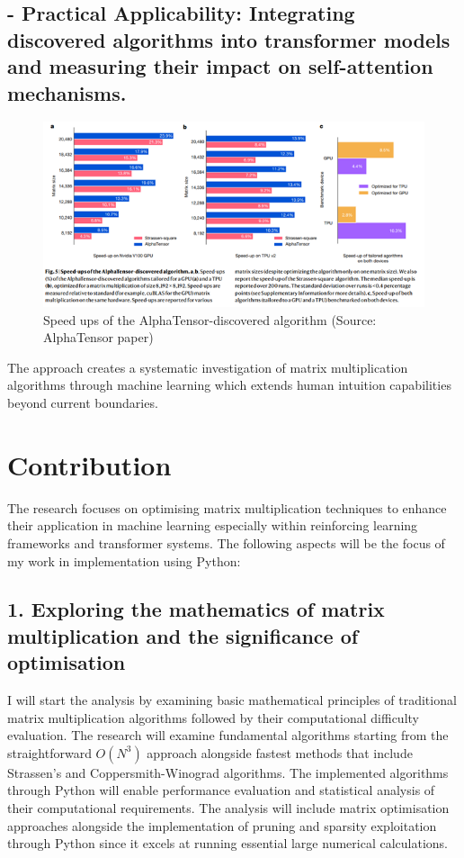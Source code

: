 \documentclass{article}
\begin{document}
\subsection{- Practical Applicability: Integrating discovered algorithms into transformer models and measuring their impact on self-attention mechanisms.} 
\begin{figure}[H]
    \centering
    \includegraphics[width=0.6\linewidth]{Picture3.png}
    \caption{Speed ups of the AlphaTensor-discovered algorithm (Source: AlphaTensor paper)}
    \label{fig:speedups-alphatensor}
\end{figure}

The approach creates a systematic investigation of matrix multiplication algorithms through machine learning which extends human intuition capabilities beyond current boundaries.

\section{Contribution}
The research focuses on optimising matrix multiplication techniques to enhance their application in machine learning especially within reinforcing learning frameworks and transformer systems. The following aspects will be the focus of my work in implementation using Python:

\subsection*{1. Exploring the mathematics of matrix multiplication and the significance of optimisation}
I will start the analysis by examining basic mathematical principles of traditional matrix multiplication algorithms followed by their computational difficulty evaluation. The research will examine fundamental algorithms starting from the straightforward \( O(N^3) \) approach alongside fastest methods that include Strassen's and Coppersmith-Winograd algorithms. The implemented algorithms through Python will enable performance evaluation and statistical analysis of their computational requirements. The analysis will include matrix optimisation approaches alongside the implementation of pruning and sparsity exploitation through Python since it excels at running essential large numerical calculations.
\end{document}
